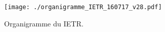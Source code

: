 \begin{figure}[H]
	\begin{center}	
		\texttt{[image: ./organigramme\_IETR\_160717\_v28.pdf]}
		\caption{Organigramme du IETR.}
		\label{fig:organigramme_IETR_160717_v28}
	\end{center}
\end{figure}












